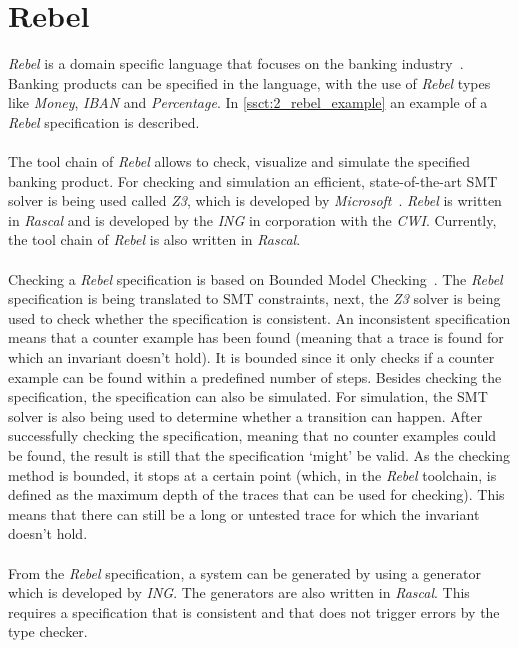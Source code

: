 \section{Rebel}
\textit{Rebel} is a domain specific language that focuses on the banking
industry~\cite{stoel2016solving}. Banking products can be specified in the
language, with the use of \textit{Rebel} types like \textit{Money},
\textit{IBAN} and \textit{Percentage}. In \autoref{ssct:2_rebel_example} an
example of a \textit{Rebel} specification is described.\\
\\
The tool chain of \textit{Rebel} allows to check, visualize and simulate the specified
banking product. For checking and simulation an efficient, state-of-the-art SMT
solver is being used called \textit{Z3}, which is developed by
\textit{Microsoft}~\cite{de2008z3}. \textit{Rebel} is written in \textit{Rascal}
and is developed by the \textit{ING} in corporation with the \textit{CWI}.
Currently, the tool chain of \textit{Rebel} is also written in
\textit{Rascal}.\\
\\
Checking a \textit{Rebel} specification is based on Bounded Model
Checking~\cite{stoel2016solving}. The \textit{Rebel} specification is being
translated to SMT constraints, next, the \textit{Z3} solver is being used to
check whether the specification is consistent. An inconsistent specification
means that a counter example has been found (meaning that a trace is found for which an
invariant doesn't hold). It is bounded since it only checks if a counter example
can be found within a predefined number of steps. Besides checking the
specification, the specification can also be simulated. For simulation, the SMT
solver is also being used to determine whether a transition can happen. After
successfully checking the specification, meaning that no counter examples could
be found, the result is still that the specification `might' be valid. As the
checking method is bounded, it stops at a certain point (which, in the
\textit{Rebel} toolchain, is defined as the maximum depth of the traces that can
be used for checking). This means that there can still be a long or untested
trace for which the invariant doesn't hold.\\
\\
From the \textit{Rebel} specification, a system can be generated by using a
generator which is developed by \textit{ING}. The generators are also written in
\textit{Rascal}. This requires a specification that is consistent and that does
not trigger errors by the type checker.

